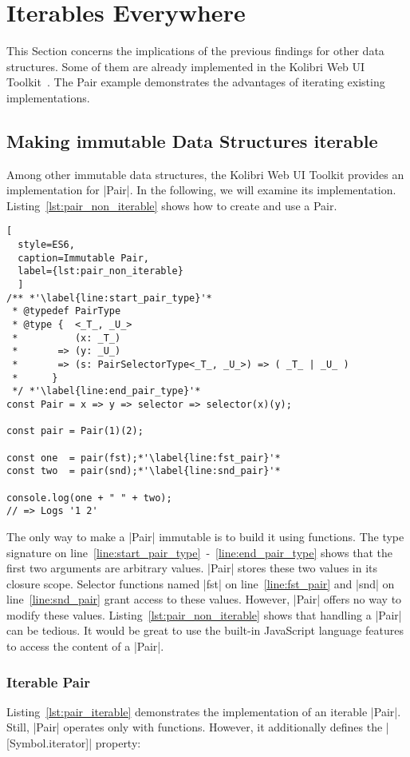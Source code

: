 \section{Iterables Everywhere}
\label{sec:Iterables Everywhere}
This Section concerns the implications of the previous findings for other
data structures. Some of them are already implemented in the Kolibri Web UI
Toolkit~\cite{kolibri}. The Pair example demonstrates the advantages of 
iterating existing implementations.

\subsection{Making immutable Data Structures iterable}
\label{sub:Making immutable Data Structures iterable}
Among other immutable data structures, the Kolibri Web UI Toolkit provides an
implementation for |Pair|. In the following, we will examine its
implementation. Listing~\ref{lst:pair_non_iterable} shows how to create and use
a Pair.

\begin{lstlisting}[
  style=ES6, 
  caption=Immutable Pair,
  label={lst:pair_non_iterable}
  ]
/** *'\label{line:start_pair_type}'*
 * @typedef PairType
 * @type {  <_T_, _U_>
 *          (x: _T_)
 *       => (y: _U_)
 *       => (s: PairSelectorType<_T_, _U_>) => ( _T_ | _U_ ) 
 *      }
 */ *'\label{line:end_pair_type}'*
const Pair = x => y => selector => selector(x)(y);

const pair = Pair(1)(2);

const one  = pair(fst);*'\label{line:fst_pair}'*
const two  = pair(snd);*'\label{line:snd_pair}'*

console.log(one + " " + two);
// => Logs '1 2'
\end{lstlisting}

The only way to make a |Pair| immutable is to build it using functions. The type 
signature on line~\ref{line:start_pair_type}~-~\ref{line:end_pair_type} shows 
that the first two arguments are arbitrary values. |Pair| stores these two values
in its closure scope. 
Selector functions named |fst| on line~\ref{line:fst_pair} and |snd| on 
line~\ref{line:snd_pair} grant access to these values. However, |Pair| offers
no way to modify these values. Listing~\ref{lst:pair_non_iterable} shows that
handling a |Pair| can be tedious. It would be great to use the built-in
JavaScript language features to access the content of a |Pair|. 

\subsubsection{Iterable Pair}
\label{subsub:Iterable Pair}
Listing~\ref{lst:pair_iterable} demonstrates the implementation of an iterable 
|Pair|. Still, |Pair| operates only with functions. However, it additionally defines the
|[Symbol.iterator]| property:

